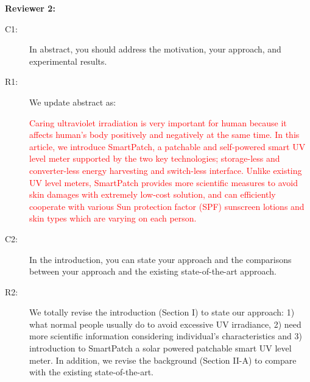 \documentclass[onecolumn]{IEEEconf}
\begin{document}
\textbf{Reviewer 2:}
\begin{description}
\item [C1: ] In abstract, you should address the motivation, your approach, and experimental results.

\item [R1: ] We update abstract as:

\textcolor{red}{Caring ultraviolet irradiation is very important for human because it affects human's body positively and negatively at the same time. In this article, we introduce SmartPatch, a patchable and self-powered smart UV level meter supported by the two key technologies; storage-less and converter-less energy harvesting and switch-less interface. Unlike existing UV level meters, SmartPatch provides more scientific measures to avoid skin damages with extremely low-cost solution, and can efficiently cooperate with various Sun protection factor (SPF) sunscreen lotions and skin types which are varying on each person.}
~\\

\item [C2: ] In the introduction, you can state your approach and the comparisons between your approach and the existing state-of-the-art approach.
\item [R2: ] We totally revise the introduction (Section I) to state our approach: 1) what normal people usually do to avoid excessive UV irradiance, 2) need more scientific information considering individual's characteristics and 3) introduction to SmartPatch a solar powered patchable smart UV level meter. In addition, we revise the background (Section II-A) to compare with the existing state-of-the-art.\\


\end{description}
\end{document}
